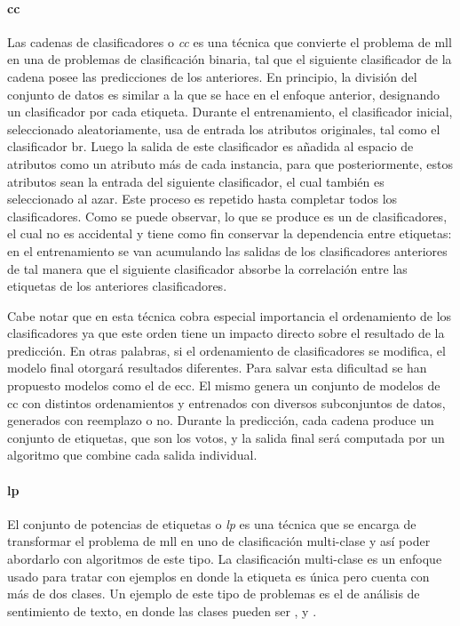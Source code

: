 \paragraph{\acrfull{cc}}

Las cadenas de clasificadores o \textit{\acrlong{cc}}
\cite{read_classifier_2011} es una técnica que convierte el problema de
\acrshort{mll} en una  de problemas de clasificación binaria,
tal que el siguiente clasificador de la cadena posee las predicciones de los
anteriores. En principio, la división del conjunto de datos es similar a la que
se hace en el enfoque anterior, designando un clasificador por cada etiqueta.
Durante el entrenamiento, el clasificador inicial, seleccionado aleatoriamente,
usa de entrada los atributos originales, tal como el clasificador \acrshort{br}.
Luego la salida de este clasificador es añadida al espacio de atributos como un
atributo más de cada instancia, para que posteriormente, estos atributos sean la
entrada del siguiente clasificador, el cual también es seleccionado al azar.
Este proceso es repetido hasta completar todos los clasificadores.  Como se
puede observar, lo que se produce es un  de
clasificadores, el cual no es accidental y tiene como fin conservar la
dependencia entre etiquetas: en el entrenamiento se van acumulando las salidas
de los clasificadores anteriores de tal manera que el siguiente clasificador
absorbe la correlación entre las etiquetas de los anteriores clasificadores.

Cabe notar que en esta técnica cobra especial importancia el ordenamiento de los
clasificadores ya que este orden tiene un impacto directo sobre el resultado de
la predicción. En otras palabras, si el ordenamiento de clasificadores se
modifica, el modelo final otorgará resultados diferentes. Para salvar esta
dificultad se han propuesto modelos como el de \acrfull{ecc}. El mismo genera un
conjunto de modelos de \acrshort{cc} con distintos ordenamientos y entrenados
con diversos subconjuntos de datos, generados con reemplazo o no. Durante la
predicción, cada cadena produce un conjunto de etiquetas, que son los votos, y
la salida final será computada por un algoritmo que combine cada salida
individual.

\paragraph{\acrfull{lp}}

El conjunto de potencias de etiquetas o \textit{\acrlong{lp}}
\cite{tsoumakas_random_2011} es una técnica que se encarga de transformar el
problema de \acrshort{mll} en uno de clasificación multi-clase y así poder
abordarlo con algoritmos de este tipo. La clasificación multi-clase es un
enfoque usado para tratar con ejemplos en donde la etiqueta es única pero cuenta
con más de dos clases. Un ejemplo de este tipo de problemas es el de análisis de
sentimiento de texto, en donde las clases pueden ser ,
 y .

